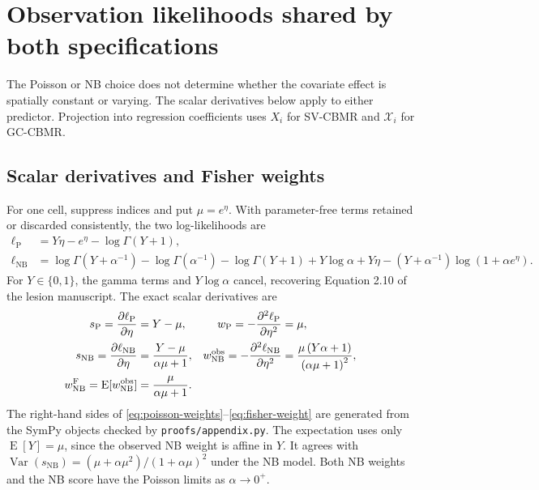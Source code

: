 \documentclass[11pt,a4paper]{article}
\newcommand{\E}{\operatorname{E}}
\newcommand{\Var}{\operatorname{Var}}
\numberwithin{equation}{section}
\begin{document}
\section{Observation likelihoods shared by both specifications}\label{sec:families}

The Poisson or NB choice does not determine whether the covariate effect
is spatially constant or varying. The scalar derivatives below apply to
either predictor. Projection into regression coefficients uses $X_i$
for SV-CBMR and $\mathcal X_i$ for GC-CBMR.

\subsection{Scalar derivatives and Fisher weights}
For one cell, suppress indices and put $\mu=e^\eta$. With parameter-free
terms retained or discarded consistently, the two log-likelihoods are
\begin{align}
 \ell_{\mathrm{P}}&=Y\eta-e^\eta-\log\Gamma(Y+1),\\
 \ell_{\mathrm{NB}}&=\log\Gamma(Y+\alpha^{-1})-\log\Gamma(\alpha^{-1})
 -\log\Gamma(Y+1)+Y\log\alpha+Y\eta
 -(Y+\alpha^{-1})\log(1+\alpha e^\eta).
 \label{eq:nb-ll}
\end{align}
For $Y\in\{0,1\}$, the gamma terms and $Y\log\alpha$ cancel, recovering
Equation 2.10 of the lesion manuscript. The exact scalar derivatives are
\begin{align}
 s_{\mathrm{P}}=\frac{\partial\ell_{\mathrm{P}}}{\partial\eta}
   &=\AppendixPoissonScore,&
 w_{\mathrm{P}}=-\frac{\partial^2\ell_{\mathrm{P}}}{\partial\eta^2}
   &=\AppendixPoissonWeight,\label{eq:poisson-weights}\\
 s_{\mathrm{NB}}=\frac{\partial\ell_{\mathrm{NB}}}{\partial\eta}
   &=\AppendixNBScore,&
 w_{\mathrm{NB}}^{\mathrm{obs}}
   =-\frac{\partial^2\ell_{\mathrm{NB}}}{\partial\eta^2}
   &=\AppendixNBObserved,\label{eq:nb-weights}\\
 w_{\mathrm{NB}}^{\mathrm{F}}
   =\E[w_{\mathrm{NB}}^{\mathrm{obs}}]
   &=\AppendixNBFisher.&&\label{eq:fisher-weight}
\end{align}
The right-hand sides of \eqref{eq:poisson-weights}--\eqref{eq:fisher-weight}
are generated from the SymPy objects checked by \texttt{proofs/appendix.py}.
The expectation uses only $\E[Y]=\mu$, since the observed NB weight is affine
in $Y$. It agrees with
$\Var(s_{\mathrm{NB}})=(\mu+\alpha\mu^2)/(1+\alpha\mu)^2$ under the NB model.
Both NB weights and the NB score have the Poisson limits as $\alpha\to0^+$.
\end{document}
